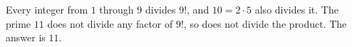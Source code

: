 Every integer from $1$ through $9$ divides $9!$, and $10=2\cdot5$ also divides it. The prime $11$ does not divide any factor of $9!$, so does not divide the product. The answer is $\boxed{11}$.
